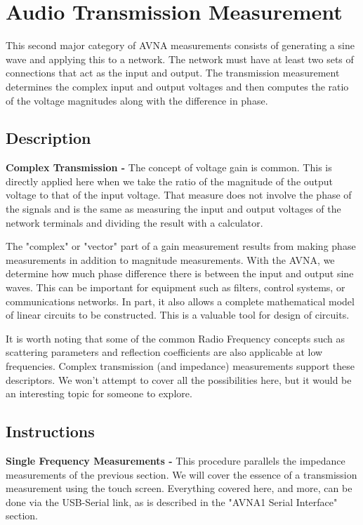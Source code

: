 \section{Audio Transmission Measurement}
\label{sect:Trans}
This second major category of AVNA measurements consists of generating a sine wave and applying this to a network. The network must have at least two sets of connections that act as the input and output. The transmission measurement determines the complex input and output voltages and then computes the ratio of the voltage magnitudes along with the difference in phase.
%
\subsection{Description}
\label{subsect:TDescr}
\textbf{Complex Transmission - }The concept of voltage gain  is common.
This is directly applied here when we take the ratio of the magnitude of the output voltage to that of the input voltage. That measure does not involve the phase of the signals and is the same as measuring the input and output voltages of the network terminals and dividing the result with a calculator.

The "complex" or "vector" part of a gain measurement results from making phase measurements in addition to magnitude measurements. With the AVNA, we determine how much phase difference there is between the input and output sine waves.
This can be important for equipment such as  filters, control systems, or communications networks. In part, it also allows a complete mathematical model of linear circuits to be constructed.  This is a valuable tool for design of circuits.

It is worth noting that some of the common Radio Frequency concepts such as scattering parameters and reflection coefficients are also applicable at low frequencies.  Complex transmission (and impedance) measurements support these descriptors.  We won't attempt to cover all the possibilities here, but it would be an interesting topic for someone to explore.

\subsection{Instructions}
\label{subsect:TInstr}
\textbf{Single Frequency Measurements - }This procedure parallels the impedance measurements of the previous section. We will cover the essence of a transmission measurement using the touch screen. Everything covered here, and more, can be done via the USB-Serial link, as is described in the "AVNA1 Serial Interface" section.


